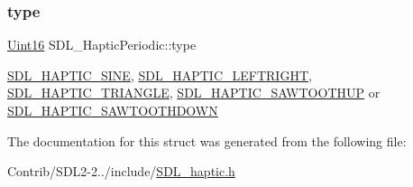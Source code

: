 \subsubsection{\texorpdfstring{type}{type}}
{\footnotesize\ttfamily \mbox{\hyperlink{_s_d_l__stdinc_8h_a31fcc0a076c9068668173ee26d33e42b}{Uint16}} S\+D\+L\+\_\+\+Haptic\+Periodic\+::type}

\mbox{\hyperlink{_s_d_l__haptic_8h_aa6d75adbfcdda5075078e7a2849da5c0}{S\+D\+L\+\_\+\+H\+A\+P\+T\+I\+C\+\_\+\+S\+I\+NE}}, \mbox{\hyperlink{_s_d_l__haptic_8h_ae047624d8458ff6400887c37a36f86d3}{S\+D\+L\+\_\+\+H\+A\+P\+T\+I\+C\+\_\+\+L\+E\+F\+T\+R\+I\+G\+HT}}, \mbox{\hyperlink{_s_d_l__haptic_8h_ae8123eaa51511507375ba6ef9220fa46}{S\+D\+L\+\_\+\+H\+A\+P\+T\+I\+C\+\_\+\+T\+R\+I\+A\+N\+G\+LE}}, \mbox{\hyperlink{_s_d_l__haptic_8h_ab8e3f40f3c2bcee8905d13b634363c3f}{S\+D\+L\+\_\+\+H\+A\+P\+T\+I\+C\+\_\+\+S\+A\+W\+T\+O\+O\+T\+H\+UP}} or \mbox{\hyperlink{_s_d_l__haptic_8h_afd64aa747034a7ccf4b55f6246525701}{S\+D\+L\+\_\+\+H\+A\+P\+T\+I\+C\+\_\+\+S\+A\+W\+T\+O\+O\+T\+H\+D\+O\+WN}} 

The documentation for this struct was generated from the following file\+:\begin{DoxyCompactItemize}
\item 
Contrib/\+S\+D\+L2-\/2../include/\mbox{\hyperlink{_s_d_l__haptic_8h}{S\+D\+L\+\_\+haptic.\+h}}\end{DoxyCompactItemize}
